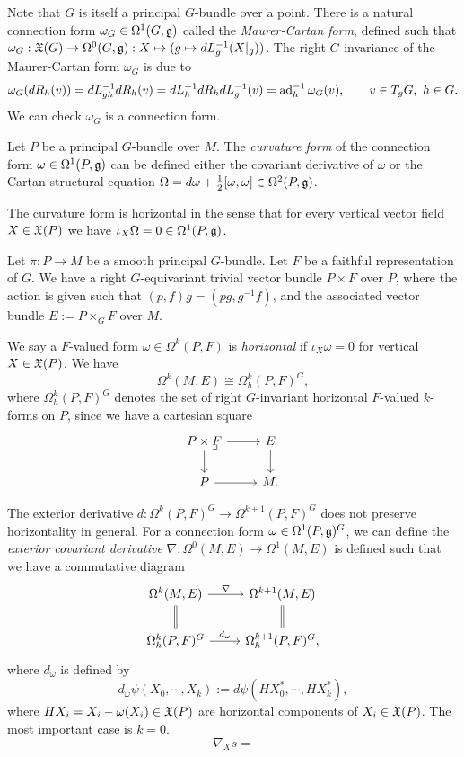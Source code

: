 \documentclass{../../large}
\begin{document}
\begin{prb}
Note that $G$ is itself a principal $G$-bundle over a point.
There is a natural connection form $\omega_G\in\Omega^1(G,\mathfrak{g})$ called the \emph{Maurer-Cartan form}, defined such that $\omega_G:\mathfrak{X}(G)\to\Omega^0(G,\mathfrak{g}):X\mapsto(g\mapsto dL_g^{-1}(X|_g))$.
The right $G$-invariance of the Maurer-Cartan form $\omega_G$ is due to
\[\omega_G(dR_h(v))=dL_{gh}^{-1}dR_h(v)=dL_h^{-1}dR_hdL_g^{-1}(v)=\operatorname{ad}_h^{-1}\omega_G(v),\qquad v\in T_gG,\ h\in G.\]
We can check $\omega_G$ is a connection form.
\end{prb}

\begin{prb}
Let $P$ be a principal $G$-bundle over $M$.
The \emph{curvature form} of the connection form $\omega\in\Omega^1(P,\mathfrak{g})$ can be defined either the covariant derivative of $\omega$ or the Cartan structural equation $\Omega=d\omega+\frac12[\omega,\omega]\in\Omega^2(P,\mathfrak{g})$.

The curvature form is horizontal in the sense that for every vertical vector field $X\in\mathfrak{X}(P)$ we have $\iota_X\Omega=0\in\Omega^1(P,\mathfrak{g})$.
\end{prb}



\begin{prb}
Let $\pi:P\to M$ be a smooth principal $G$-bundle.
Let $F$ be a faithful representation of $G$.
We have a right $G$-equivariant trivial vector bundle $P\times F$ over $P$, where the action is given such that $(p,f)g=(pg,g^{-1}f)$, and the associated vector bundle $E:=P\times_GF$ over $M$.

We say a $F$-valued form $\omega\in\Omega^k(P,F)$ is \emph{horizontal} if $\iota_X\omega=0$ for vertical $X\in\mathfrak{X}(P)$.
We have
\[\Omega^k(M,E)\cong\Omega_h^k(P,F)^G,\]
where $\Omega_h^k(P,F)^G$ denotes the set of right $G$-invariant horizontal $F$-valued $k$-forms on $P$, since we have a cartesian square
\[\begin{tikzcd}
P\times F \pullback\rar\dar & E \dar \\ P \rar & M.
\end{tikzcd}\]

The exterior derivative $d:\Omega^k(P,F)^G\to\Omega^{k+1}(P,F)^G$ does not preserve horizontality in general.
For a connection form $\omega\in\Omega^1(P,\mathfrak{g})^G$, we can define the \emph{exterior covariant derivative} $\nabla:\Omega^0(M,E)\to\Omega^1(M,E)$ is defined such that we have a commutative diagram
\[\begin{tikzcd}
\Omega^k(M,E) \rar{\nabla}\dar[equal] & \Omega^{k+1}(M,E)\dar[equal]\\
\Omega_h^k(P,F)^G \rar{d_\omega} & \Omega_h^{k+1}(P,F)^G,
\end{tikzcd}\]
where $d_\omega$ is defined by
\[d_\omega\psi(X_0,\cdots,X_k):=d\psi(HX_0^*,\cdots,HX_k^*),\]
where $HX_i=X_i-\omega(X_i)\in\mathfrak{X}(P)$ are horizontal components of $X_i\in\mathfrak{X}(P)$.
The most important case is $k=0$.
\[\nabla_Xs=\]
\end{prb}
\end{document}
